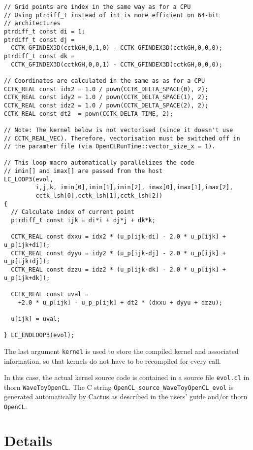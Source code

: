 \begin{verbatim}
// Grid points are index in the same way as for a CPU
// Using ptrdiff_t instead of int is more efficient on 64-bit
// architectures
ptrdiff_t const di = 1;
ptrdiff_t const dj =
  CCTK_GFINDEX3D(cctkGH,0,1,0) - CCTK_GFINDEX3D(cctkGH,0,0,0);
ptrdiff_t const dk =
  CCTK_GFINDEX3D(cctkGH,0,0,1) - CCTK_GFINDEX3D(cctkGH,0,0,0);

// Coordinates are calculated in the same as as for a CPU
CCTK_REAL const idx2 = 1.0 / pown(CCTK_DELTA_SPACE(0), 2);
CCTK_REAL const idy2 = 1.0 / pown(CCTK_DELTA_SPACE(1), 2);
CCTK_REAL const idz2 = 1.0 / pown(CCTK_DELTA_SPACE(2), 2);
CCTK_REAL const dt2  = pown(CCTK_DELTA_TIME, 2);
  
// Note: The kernel below is not vectorised (since it doesn't use
// CCTK_REAL_VEC). Therefore, vectorisation must be switched off in
// the paramter file (via OpenCLRunTime::vector_size_x = 1).

// This loop macro automatically parallelizes the code
// imin[] and imax[] are passed from the host
LC_LOOP3(evol,
         i,j,k, imin[0],imin[1],imin[2], imax[0],imax[1],imax[2],
         cctk_lsh[0],cctk_lsh[1],cctk_lsh[2])
{
  // Calculate index of current point
  ptrdiff_t const ijk = di*i + dj*j + dk*k;
  
  CCTK_REAL const dxxu = idx2 * (u_p[ijk-di] - 2.0 * u_p[ijk] + u_p[ijk+di]);
  CCTK_REAL const dyyu = idy2 * (u_p[ijk-dj] - 2.0 * u_p[ijk] + u_p[ijk+dj]);
  CCTK_REAL const dzzu = idz2 * (u_p[ijk-dk] - 2.0 * u_p[ijk] + u_p[ijk+dk]);
  
  CCTK_REAL const uval =
    +2.0 * u_p[ijk] - u_p_p[ijk] + dt2 * (dxxu + dyyu + dzzu);
  
  u[ijk] = uval;
  
} LC_ENDLOOP3(evol);
\end{verbatim}

The last argument \texttt{kernel} is used to store the compiled kernel
and associated information, so that kernels do not have to be
recompiled for every call.

In this case, the actual kernel source code is contained in a source
file \texttt{evol.cl} in thorn \texttt{WaveToyOpenCL}. The C string
\texttt{OpenCL\_source\_WaveToyOpenCL\_evol} is generated
automatically by Cactus as described in the users' guide and/or thorn
\texttt{OpenCL}\@.



\section{Details}


